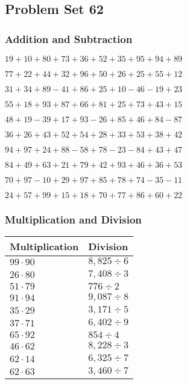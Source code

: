 \hypertarget{problem-set-62}{%
\subsection{Problem Set 62}\label{problem-set-62}}

\hypertarget{addition-and-subtraction}{%
\subsubsection{Addition and
Subtraction}\label{addition-and-subtraction}}

\(19+10+80+73+36+52+35+95+94+89\)

\(77+22+44+32+96+50+26+25+55+12\)

\(31+34+89-41+86+25+10-46-19+23\)

\(55+18+93+87+66+81+25+73+43+15\)

\(48+19-39+17+93-26+85+46+84-87\)

\(36+26+43+52+54+28+33+53+38+42\)

\(94+97+24+88-58+78-23-84+43+47\)

\(84+49+63+21+79+42+93+46+36+53\)

\(70+97-10+29+97+85+78+74-35-11\)

\(24+57+99+15+18+70+77+86+60+22\)

\hypertarget{multiplication-and-division}{%
\subsubsection{Multiplication and
Division}\label{multiplication-and-division}}

\begin{longtable}[]{@{}ll@{}}
\toprule
Multiplication & Division\tabularnewline
\midrule
\endhead
\(99\cdot90\) & \(8,825÷6\)\tabularnewline
\(26\cdot80\) & \(7,408÷3\)\tabularnewline
\(51\cdot79\) & \(776÷2\)\tabularnewline
\(91\cdot94\) & \(9,087÷8\)\tabularnewline
\(35\cdot29\) & \(3,171÷5\)\tabularnewline
\(37\cdot71\) & \(6,402÷9\)\tabularnewline
\(65\cdot92\) & \(854÷4\)\tabularnewline
\(46\cdot62\) & \(8,228÷3\)\tabularnewline
\(62\cdot14\) & \(6,325÷7\)\tabularnewline
\(62\cdot63\) & \(3,460÷7\)\tabularnewline
\bottomrule
\end{longtable}
